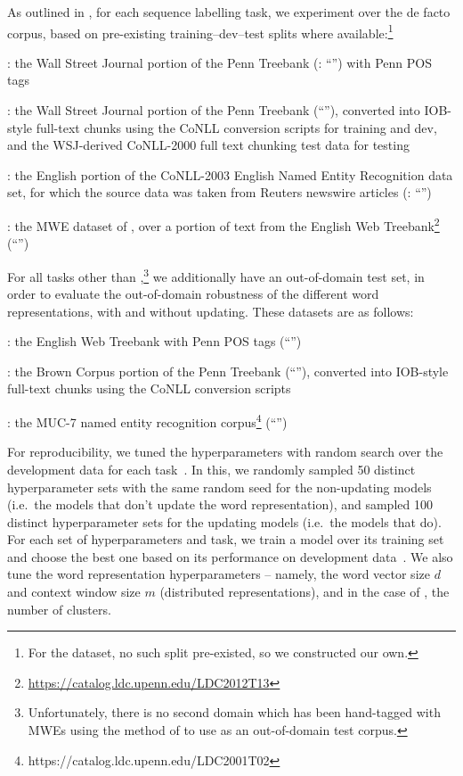 As outlined in , for each sequence labelling task, we
experiment over the de facto corpus, based on pre-existing
training--dev--test splits where available:\footnote{For the \mwe
  dataset, no such split pre-existed, so we constructed our own.}
\begin{compactenum}
\item[\textbf{\pos}:] the Wall Street Journal portion of the Penn
  Treebank (: ``\WSJ'')
  with Penn POS tags
\item[\textbf{\chunking}:] the Wall Street Journal portion of the Penn
  Treebank (``\WSJ''),
  converted into IOB-style full-text chunks using the CoNLL conversion
  scripts for training and dev, and the WSJ-derived CoNLL-2000 full text chunking
  test data for testing \cite{TjongKimSang:Buchholz:2000}
\item[\textbf{\ner}:] the English portion of the CoNLL-2003 English Named Entity Recognition
  data set, for which the source data was taken from Reuters newswire
  articles (: ``\Reuters'')
\item[\textbf{\mwe}:] the MWE dataset of , over a portion of text from the
  English Web Treebank\footnote{\url{https://catalog.ldc.upenn.edu/LDC2012T13}} (``\EWT'')
\end{compactenum}
 For all tasks other
than \mwe,\footnote{Unfortunately, there is no
  second domain which has been hand-tagged with MWEs using the method of
   to use as an out-of-domain test corpus.} we
additionally have an out-of-domain test set, in order to evaluate the
out-of-domain robustness of the different word representations, with and
without updating. These datasets are as follows:
\begin{compactenum}
\item[\textbf{\pos}:] the English Web Treebank with Penn POS tags (``\EWT'')
\item[\textbf{\chunking}:] the Brown Corpus portion of the Penn
  Treebank (``\Brown''), 
  converted into IOB-style full-text chunks using the CoNLL conversion
  scripts
\item[\textbf{\ner}:] the MUC-7 named entity recognition corpus\footnote{https://catalog.ldc.upenn.edu/LDC2001T02} (``\MUC'')
\end{compactenum}

For reproducibility, we tuned the hyperparameters with random search
over the development data for each task~\cite{bergstra2012random}. 
In this, we randomly sampled 50 distinct hyperparameter sets with the
same random seed for the non-updating models (i.e.\ the models that
don't update the word representation), and
sampled 100 distinct hyperparameter sets for the updating models (i.e.\
the models that do). 
For each set of hyperparameters and task, we train a model over its
training set and choose the best one based on its performance on development data~\cite{turian2010word}. 
We also tune the word representation hyperparameters -- namely, the word
vector size $d$ and context window size $m$ (distributed
representations), and in the case of \Brown, the number of clusters.

